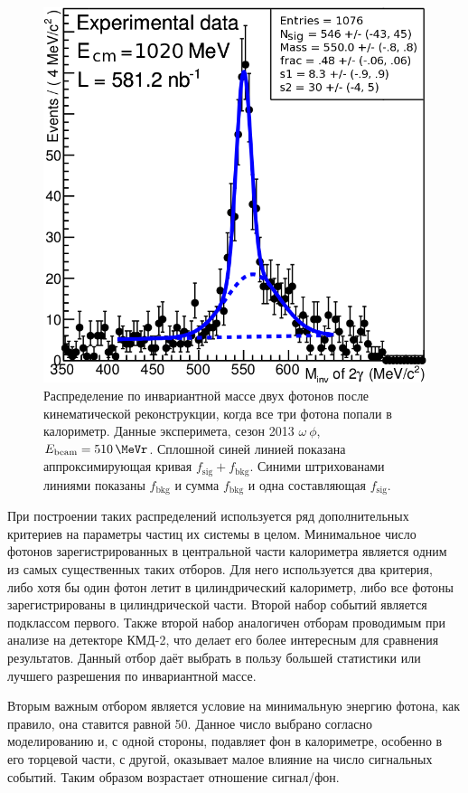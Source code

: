 \begin{figure}
\begin{minipage}[T]{.48\textwidth}
		\includegraphics[width=\textwidth]{img/etag.png}
		\caption{Распределение по инвариантной массе двух фотонов после кинематической реконструкции,
			когда все три фотона попали в  калориметр.
			Данные эксперимета, сезон 2013 $\omega \ \phi$, $E_{\text{beam}} = \SI{510}{\MeVr}$.
			Сплошной синей линией показана аппроксимирующая кривая $f_{\text{sig}} + f_{\text{bkg}}$.
			Синими штрихованами линиями показаны $f_{\text{bkg}}$ и сумма $f_{\text{bkg}}$ и одна составляющая $f_{\text{sig}}$.}
	\end{minipage}
\end{figure}

При построении таких распределений используется ряд дополнительных критериев на параметры частиц их системы в целом.
Минимальное число фотонов зарегистрированных в центральной части калориметра является одним из самых существенных таких отборов.
Для него используется два критерия,
либо хотя бы один фотон летит в цилиндрический калориметр,
либо все фотоны зарегистрированы в цилиндрической части.
Второй набор событий является подклассом первого.
Также второй набор аналогичен отборам проводимым при анализе на детекторе КМД-2,
что делает его более интересным для сравнения результатов.
Данный отбор даёт выбрать в пользу большей статистики или лучшего разрешения по инвариантной массе.

Вторым важным отбором является условие на минимальную энергию фотона,
как правило, она ставится равной \SI{50}{\MeVr}.
Данное число выбрано согласно моделированию и,
с одной стороны, подавляет фон в калориметре,
особенно в его торцевой части, с другой,
оказывает малое влияние на число сигнальных событий.
Таким образом возрастает отношение сигнал/фон.

